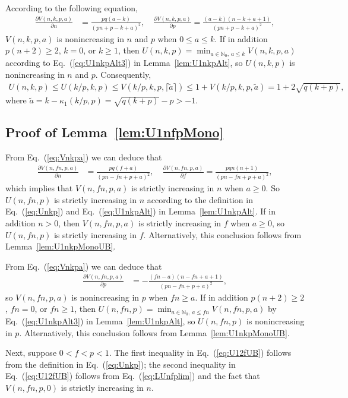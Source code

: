 \documentclass[aop]{imsart}
\theoremstyle{plain}
\theoremstyle{remark}
\newcommand{\bbN}{\mathbb{N}}
\newcommand{\1}{\operatorname{\uppercase\expandafter{\romannumeral1}}}
\newcommand{\2}{\operatorname{\uppercase\expandafter{\romannumeral2}}}
\newcommand{\3}{\operatorname{\uppercase\expandafter{\romannumeral3}}}
\newcommand{\4}{\operatorname{\uppercase\expandafter{\romannumeral4}}}
\newcommand{\5}{\operatorname{\uppercase\expandafter{\romannumeral5}}}
\newcommand{\6}{\operatorname{\uppercase\expandafter{\romannumeral6}}}
\newcommand{\7}{\operatorname{\uppercase\expandafter{\romannumeral7}}}
\newcommand{\8}{\operatorname{\uppercase\expandafter{\romannumeral8}}}
\newcommand{\9}{\operatorname{\uppercase\expandafter{\romannumeral9}}}
\newcommand{\eref}[1]{Eq.~\textup{(\ref{#1})}}
\newcommand{\lref}[1]{Lemma~\ref{#1}}
\begin{document}
\begin{appendix}
	
	According to the following equation,
	\begin{align}
	\frac{\partial V(n,k,p,a)}{\partial n}&=\frac{p q (a-k)}{(p n+p-k+a)^2},\quad 
	\frac{\partial V(n,k,p,a)}{\partial p}=\frac{ (a-k)(n-k+a+1)}{(p n+p-k+a)^2},
	\end{align}
	$V(n,k,p,a)$ is nonincreasing in $n$ and $p$ when $0\leq a\leq k$. If in addition  $p(n+2)\geq 2$, $k=0$, or $k\geq 1$, then	$U(n,k,p)=\min_{a\in \bbN_0,\, a\leq k} V(n,k,p,a)$ according to \eref{eq:U1nkpAlt3} in \lref{lem:U1nkpAlt}, so $U(n,k,p)$ is nonincreasing in $n$ and $p$. Consequently,	
	\begin{align}
	U(n,k,p)\leq U(k/p,k,p)\leq V(k/p,k,p,\lceil\tilde{a}\rceil)\leq 1+V(k/p,k,p,\tilde{a})=1+2\sqrt{q (k+p)},
	\end{align}		
	where $\tilde{a}=k-\kappa_1(k/p,p)=\sqrt{q (k+p)}-p>-1$. 		




\subsection{Proof of \lref{lem:U1nfpMono}}
From \eref{eq:Vnkpa} we can deduce that
	\begin{align}
	\frac{\partial V(n,f n,p,a)}{\partial n}&=\frac{p q (f+a)}{(p n-f n+p+a)^2},\quad
	\frac{\partial V(n,f n,p,a)}{\partial f}=\frac{p q n (n+1)}{(p n-f n+p+a)^2},
	\end{align}
which implies that	$V(n,f n,p,a)$ is strictly increasing in $n$ when $a\geq 0$.  So 	$U(n,f n,p)$ is strictly increasing in $n$ according to the definition in \eref{eq:Unkp} and \eref{eq:U1nkpAlt} in \lref{lem:U1nkpAlt}. If in addition $n>0$, then $V(n,f n,p,a)$ is strictly increasing in $f$ when $a\geq 0$, so 	$U(n,f n,p)$ is strictly increasing in  $f$.   Alternatively, this conclusion follows from \lref{lem:U1nkpMonoUB}.
	
From \eref{eq:Vnkpa} we can deduce that
	\begin{align}
	\frac{\partial V(n,f n,p,a)}{\partial p}&=-\frac{ (f n-a)(n-f n+a+1)}{(p n-f n+p+a)^2},
	\end{align}
so 	$V(n,f n,p,a)$ is nonincreasing in $p$  when $f n\geq a$. If in addition $p(n+2)\geq 2$, $f n=0$, or $f n\geq 1$, then $U(n,fn,p)=\min_{a\in \bbN_0,\, a\leq fn} V(n,fn,p,a)$ by \eref{eq:U1nkpAlt3} in \lref{lem:U1nkpAlt}, 
so 	$U(n,f n,p)$ is nonincreasing in $p$. Alternatively, this conclusion follows from \lref{lem:U1nkpMonoUB}.
	
	Next, suppose $ 0<f<p<1$. The first  inequality in \eref{eq:U12fUB} follows from  the definition in \eref{eq:Unkp}; the second inequality in  \eref{eq:U12fUB} follows from \eref{eq:LUnfplim} and the fact that  $V(n,f n,p,0)$ is strictly increasing in $n$. 




\end{appendix}
\end{document}
